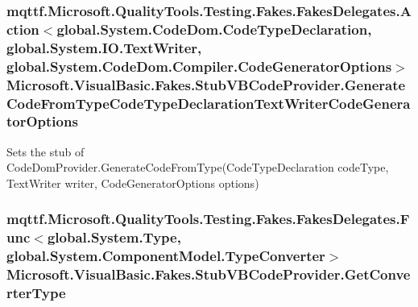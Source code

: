 \hypertarget{class_microsoft_1_1_visual_basic_1_1_fakes_1_1_stub_v_b_code_provider_a37302505334a994672a3cf0d896c243c}{
\subsubsection[{Generate\-Code\-From\-Type\-Code\-Type\-Declaration\-Text\-Writer\-Code\-Generator\-Options}]{\setlength{\rightskip}{0pt plus 5cm}mqttf.\-Microsoft.\-Quality\-Tools.\-Testing.\-Fakes.\-Fakes\-Delegates.\-Action$<$global.\-System.\-Code\-Dom.\-Code\-Type\-Declaration, global.\-System.\-I\-O.\-Text\-Writer, global.\-System.\-Code\-Dom.\-Compiler.\-Code\-Generator\-Options$>$ Microsoft.\-Visual\-Basic.\-Fakes.\-Stub\-V\-B\-Code\-Provider.\-Generate\-Code\-From\-Type\-Code\-Type\-Declaration\-Text\-Writer\-Code\-Generator\-Options}}\label{class_microsoft_1_1_visual_basic_1_1_fakes_1_1_stub_v_b_code_provider_a37302505334a994672a3cf0d896c243c}


Sets the stub of Code\-Dom\-Provider.\-Generate\-Code\-From\-Type(\-Code\-Type\-Declaration code\-Type, Text\-Writer writer, Code\-Generator\-Options options)

\hypertarget{class_microsoft_1_1_visual_basic_1_1_fakes_1_1_stub_v_b_code_provider_a5d023b1a99fb344137c125acc8803517}{
\subsubsection[{Get\-Converter\-Type}]{\setlength{\rightskip}{0pt plus 5cm}mqttf.\-Microsoft.\-Quality\-Tools.\-Testing.\-Fakes.\-Fakes\-Delegates.\-Func$<$global.\-System.\-Type, global.\-System.\-Component\-Model.\-Type\-Converter$>$ Microsoft.\-Visual\-Basic.\-Fakes.\-Stub\-V\-B\-Code\-Provider.\-Get\-Converter\-Type}}\label{class_microsoft_1_1_visual_basic_1_1_fakes_1_1_stub_v_b_code_provider_a5d023b1a99fb344137c125acc8803517}


